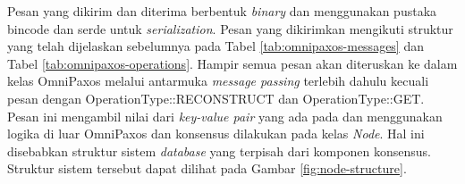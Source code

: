 Pesan yang dikirim dan diterima berbentuk \textit{binary} dan menggunakan pustaka bincode dan serde untuk \textit{serialization}. Pesan yang dikirimkan mengikuti struktur yang telah dijelaskan sebelumnya pada Tabel \ref{tab:omnipaxos-messages} dan Tabel \ref{tab:omnipaxos-operations}. Hampir semua pesan akan diteruskan ke dalam kelas OmniPaxos melalui antarmuka \textit{message passing} terlebih dahulu kecuali pesan dengan OperationType::RECONSTRUCT dan OperationType::GET. Pesan ini mengambil nilai dari \textit{key-value pair} yang ada pada  dan menggunakan logika di luar OmniPaxos dan konsensus dilakukan pada kelas \textit{Node}. Hal ini disebabkan struktur sistem \textit{database} yang terpisah dari komponen konsensus. Struktur sistem tersebut dapat dilihat pada Gambar \ref{fig:node-structure}.
